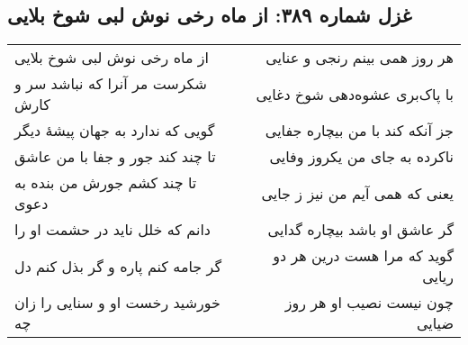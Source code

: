 \begin{center}
\section*{غزل شماره ۳۸۹: از ماه رخی نوش لبی شوخ بلایی}
\label{sec:389}
\begin{longtable}{l p{0.5cm} r}
از ماه رخی نوش لبی شوخ بلایی
&&
هر روز همی بینم رنجی و عنایی
\\
شکرست مر آنرا که نباشد سر و کارش
&&
با پاک‌بری عشوه‌دهی شوخ دغایی
\\
گویی که ندارد به جهان پیشهٔ دیگر
&&
جز آنکه کند با من بیچاره جفایی
\\
تا چند کند جور و جفا با من عاشق
&&
ناکرده به جای من یکروز وفایی
\\
تا چند کشم جورش من بنده به دعوی
&&
یعنی که همی آیم من نیز ز جایی
\\
دانم که خلل ناید در حشمت او را
&&
گر عاشق او باشد بیچاره گدایی
\\
گر جامه کنم پاره و گر بذل کنم دل
&&
گوید که مرا هست درین هر دو ریایی
\\
خورشید رخست او و سنایی را زان چه
&&
چون نیست نصیب او هر روز ضیایی
\\
\end{longtable}
\end{center}
